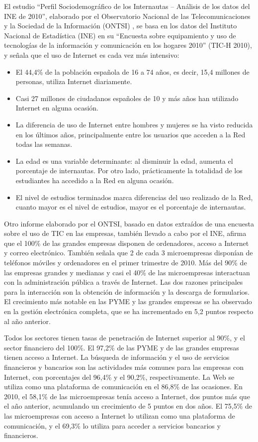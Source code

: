 \begin{multicols}{2}
El estudio “Perfil Sociodemográfico de los Internautas – Análisis de los datos del INE de 2010”, elaborado por el Observatorio Nacional de las Telecomunicaciones y la Sociedad de la Información (ONTSI) \cite{ontsi}, se basa en los datos del Instituto Nacional de Estadística (INE) en su “Encuesta sobre equipamiento y uso de tecnologías de la información y comunicación en los hogares 2010” (TIC-H 2010), y señala que el uso de Internet es cada vez más intensivo:

\begin{itemize}
  \item	El 44,4\% de la población española de 16 a 74 años, es decir, 15,4 millones de personas, utiliza Internet diariamente.
  \item	Casi 27 millones de ciudadanos españoles de 10 y más años han utilizado Internet en alguna ocasión.
  \item	La diferencia de uso de Internet entre hombres y mujeres se ha visto reducida en los últimos años, principalmente entre los usuarios que acceden a la Red todas las semanas.
  \item	La edad es una variable determinante: al disminuir la edad, aumenta el porcentaje de internautas. Por otro lado, prácticamente la totalidad de los estudiantes ha accedido a la Red en alguna ocasión.
  \item	El nivel de estudios terminados marca diferencias del uso realizado de la Red, cuanto mayor es el nivel de estudios, mayor es el porcentaje de internautas.
\end{itemize}

Otro informe elaborado por el ONTSI, basado en datos extraídos de una encuesta sobre el uso de TIC en las empresas, también llevado a cabo por el INE, afirma que el 100\% de las grandes empresas disponen de ordenadores, acceso a Internet y correo electrónico. También señala que 2 de cada 3 microempresas disponían de teléfonos móviles y ordenadores en el primer trimestre de 2010. Más del 90\% de las empresas grandes y medianas y casi el 40\% de las microempresas interactuan con la administración pública a través de Internet. Las dos razones principales para la interacción son la obtención de información y la descarga de formularios. El crecimiento más notable en las PYME y las grandes empresas se ha observado en la gestión electrónica completa, que se ha incrementado en 5,2 puntos respecto al año anterior.

Todos los sectores tienen tasas de penetración de Internet superior al 90\%, y el sector financiero del 100\%. El 97,2\% de las PYME y de las grandes empresas tienen acceso a Internet. La búsqueda de información y el uso de servicios financieros y bancarios son las actividades más comunes para las empresas con Internet, con porcentajes del 96,4\% y el 90,2\%, respectivamente. La Web se utiliza como una plataforma de comunicación en el 86,8\% de las ocasiones. En 2010, el 58,1\% de las microempresas tenía acceso a Internet, dos puntos más que el año anterior, acumulando un crecimiento de 5 puntos en dos años. El 75,5\% de las microempresas con acceso a Internet lo utilizan como una plataforma de comunicación, y el 69,3\% lo utiliza para acceder a servicios bancarios y financieros. 


\end{multicols}
